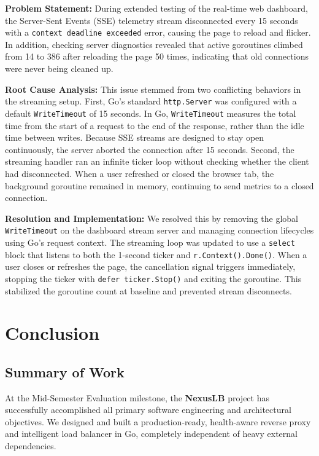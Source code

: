 \documentclass[12pt,openany]{report}
\begin{document}
\textbf{Problem Statement:} During extended testing of the real-time web dashboard, the Server-Sent Events (SSE) telemetry stream disconnected every 15 seconds with a \texttt{context deadline exceeded} error, causing the page to reload and flicker. In addition, checking server diagnostics revealed that active goroutines climbed from 14 to 386 after reloading the page 50 times, indicating that old connections were never being cleaned up.

\textbf{Root Cause Analysis:} This issue stemmed from two conflicting behaviors in the streaming setup. First, Go's standard \texttt{http.Server} was configured with a default \texttt{WriteTimeout} of 15 seconds. In Go, \texttt{WriteTimeout} measures the total time from the start of a request to the end of the response, rather than the idle time between writes. Because SSE streams are designed to stay open continuously, the server aborted the connection after 15 seconds. Second, the streaming handler ran an infinite ticker loop without checking whether the client had disconnected. When a user refreshed or closed the browser tab, the background goroutine remained in memory, continuing to send metrics to a closed connection.

\textbf{Resolution and Implementation:} We resolved this by removing the global \texttt{WriteTimeout} on the dashboard stream server and managing connection lifecycles using Go's request context. The streaming loop was updated to use a \texttt{select} block that listens to both the 1-second ticker and \texttt{r.Context().Done()}. When a user closes or refreshes the page, the cancellation signal triggers immediately, stopping the ticker with \texttt{defer ticker.Stop()} and exiting the goroutine. This stabilized the goroutine count at baseline and prevented stream disconnects.


\chapter{Conclusion}

\section{Summary of Work}

At the Mid-Semester Evaluation milestone, the \textbf{NexusLB} project has successfully accomplished all primary software engineering and architectural objectives. We designed and built a production-ready, health-aware reverse proxy and intelligent load balancer in Go, completely independent of heavy external dependencies. 
\end{document}
